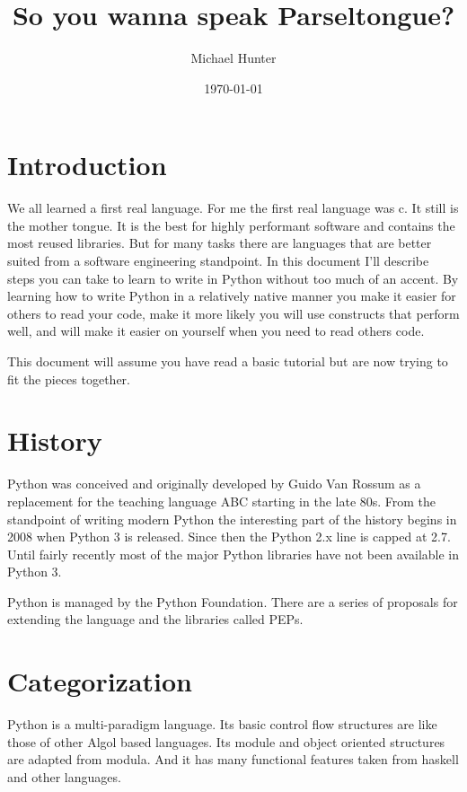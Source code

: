 \documentclass[]{article}
\title{So you wanna speak Parseltongue?}
\author{Michael Hunter}
\date{\today}
\begin{document}
\maketitle

\tableofcontents

\section{Introduction}

We all learned a first real language.  For me the first real
language was c. It still is the mother tongue. It is the best for
highly performant software and contains the most reused libraries.
But for many tasks there are languages that are better suited from a
software engineering standpoint. In this document I'll describe steps
you can take to learn to write in Python without too much of an accent.
By learning how to write Python in a relatively native manner you make
it easier for others to read your code, make it more likely you will use
constructs that perform well, and will make it easier on yourself when
you need to read others code.

This document will assume you have read a basic tutorial but are now
trying to fit the pieces together.

\section{History}

Python was conceived and originally developed by Guido Van Rossum as a
replacement for the teaching language ABC starting in the late 80s.
From the standpoint of writing modern Python the interesting part of
the history begins in 2008 when Python 3 is released. Since then the
Python 2.x line is capped at 2.7. Until fairly recently most of the
major Python libraries have not been available in Python 3.

Python is managed by the Python Foundation. There are a series of
proposals for extending the language and the libraries called PEPs.

\section{Categorization}

Python is a multi-paradigm language. Its basic control flow structures
are like those of other Algol based languages. Its module and object
oriented structures are adapted from modula. And it has many functional
features taken from haskell and other languages.
\end{document}
